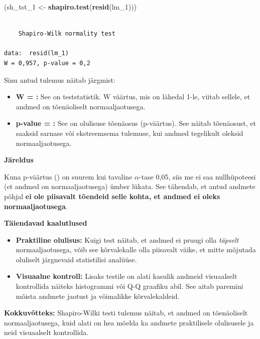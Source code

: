 \documentclass[
]{book}
\newenvironment{Shaded}{\begin{snugshade}}{\end{snugshade}}
\newcommand{\FunctionTok}[1]{\textcolor[rgb]{0.13,0.29,0.53}{\textbf{#1}}}
\newcommand{\NormalTok}[1]{#1}
\newcommand{\OtherTok}[1]{\textcolor[rgb]{0.56,0.35,0.01}{#1}}
\providecommand{\tightlist}{%
  \setlength{\itemsep}{0pt}\setlength{\parskip}{0pt}}
\renewenvironment{Shaded} {\begin{snugshade}\footnotesize} {\end{snugshade}}
\begin{document}
\begin{Shaded}
\begin{Highlighting}[]
\NormalTok{(sh\_tst\_1 }\OtherTok{\textless{}{-}} \FunctionTok{shapiro.test}\NormalTok{(}\FunctionTok{resid}\NormalTok{(lm\_1)))}
\end{Highlighting}
\end{Shaded}

\begin{verbatim}

    Shapiro-Wilk normality test

data:  resid(lm_1)
W = 0,957, p-value = 0,2
\end{verbatim}

Sinu antud tulemus näitab järgmist:

\begin{itemize}
\tightlist
\item
  \textbf{W = :} See on teststatistik. W väärtus, mis on lähedal 1-le, viitab sellele, et andmed on tõenäoliselt normaaljaotusega.
\item
  \textbf{p-value = :} See on olulisuse tõenäosus (p-väärtus). See näitab tõenäosust, et saaksid sarnase või ekstreemsema tulemuse, kui andmed tegelikult oleksid normaaljaotusega.
\end{itemize}

\textbf{Järeldus}

Kuna p-väärtus () on suurem kui tavaline \(\alpha\)-tase 0,05, siis me ei saa nullhüpoteesi (et andmed on normaaljaotusega) ümber lükata. See tähendab, et antud andmete põhjal \textbf{ei ole piisavalt tõendeid selle kohta, et andmed ei oleks normaaljaotusega}.

\textbf{Täiendavad kaalutlused}

\begin{itemize}
\tightlist
\item
  \textbf{Praktiline olulisus:} Kuigi test näitab, et andmed ei pruugi olla \emph{täpselt} normaaljaotusega, võib see kõrvalekalle olla piisavalt väike, et mitte mõjutada oluliselt järgnevaid statistilisi analüüse.
\item
  \textbf{Visuaalne kontroll:} Lisaks testile on alati kasulik andmeid visuaalselt kontrollida näiteks histogrammi või Q-Q graafiku abil. See aitab paremini mõista andmete jaotust ja võimalikke kõrvalekaldeid.
\end{itemize}

\textbf{Kokkuvõtteks:} Shapiro-Wilki testi tulemus näitab, et andmed on tõenäoliselt normaaljaotusega, kuid alati on hea mõelda ka andmete praktilisele olulisusele ja neid visuaalselt kontrollida.
\end{document}
